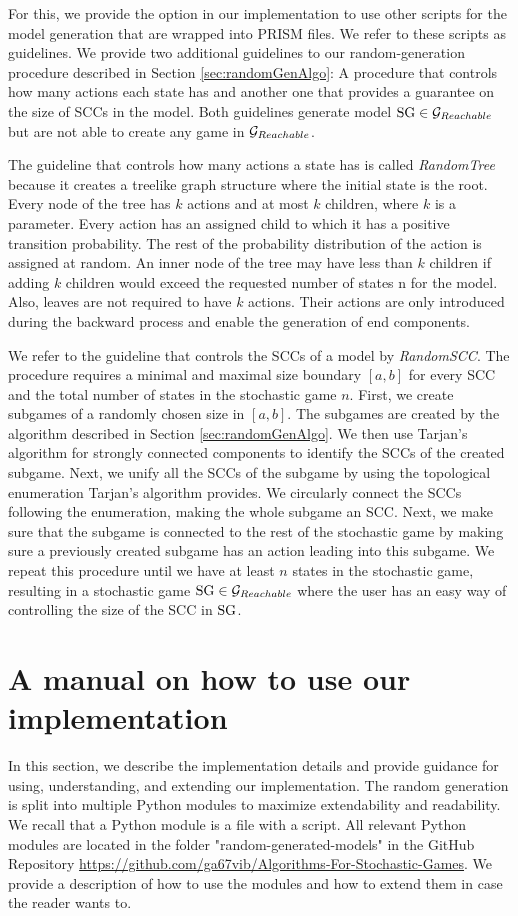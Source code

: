 For this, we provide the option in our implementation to use other scripts for the model generation that are wrapped into PRISM files. We refer to these scripts as guidelines.
We provide two additional guidelines to our random-generation procedure described in Section \ref{sec:randomGenAlgo}: 
A procedure that controls how many actions each state has and another one that provides a guarantee on the size of SCCs in the model.
Both guidelines generate model $\textrm{SG} \in \mathcal{G}_{Reachable}$ but are not able to create any game in $\mathcal{G}_{Reachable}$.

The guideline that controls how many actions a state has is called \emph{RandomTree} 
because it creates a treelike graph structure where the initial state is the root.
Every node of the tree has $k$ actions and at most $k$ children, where $k$ is a parameter. 
Every action has an assigned child to which it has a positive transition probability.
The rest of the probability distribution of the action is assigned at random.
An inner node of the tree may have less than $k$ children if adding $k$ children would exceed the requested number of states n for the model.
Also, leaves are not required to have $k$ actions.
Their actions are only introduced during the backward process and enable the generation of end components.

We refer to the guideline that controls the SCCs of a model by \emph{RandomSCC}.
The procedure requires a minimal and maximal size boundary $[a, b]$ for every SCC and the total number of states in the stochastic game $n$.
First, we create subgames of a randomly chosen size in $[a,b]$.
The subgames are created by the algorithm described in Section \ref{sec:randomGenAlgo}.
We then use Tarjan's algorithm for strongly connected components \cite{TarjansAlgorithm} to identify the SCCs of the created subgame.
Next, we unify all the SCCs of the subgame by using the topological enumeration Tarjan's algorithm provides.
We circularly connect the SCCs following the enumeration, making the whole subgame an SCC.
Next, we make sure that the subgame is connected to the rest of the stochastic game by making sure a previously created subgame has an action
leading into this subgame. We repeat this procedure until we have at least $n$ states in the stochastic game, 
resulting in a stochastic game $\textrm{SG} \in \mathcal{G}_{Reachable}$ where the user has an easy way of controlling the size of the SCC in $\textrm{SG}$.

\section{A manual on how to use our implementation}
In this section, we describe the implementation details and provide guidance for using, understanding, and extending our implementation.
The random generation is split into multiple Python modules to maximize extendability and readability. 
We recall that a Python module is a file with a script.
All relevant Python modules are located in the folder "random-generated-models" in the GitHub Repository \url{https://github.com/ga67vib/Algorithms-For-Stochastic-Games}.
We provide a description of how to use the modules and how to extend them in case the reader wants to.

